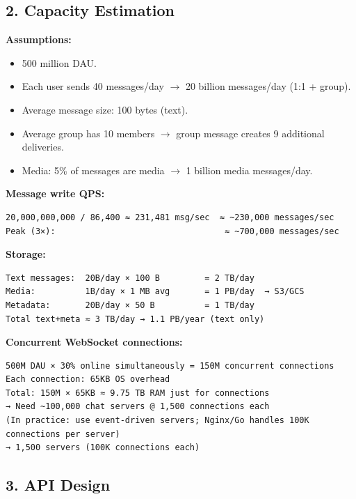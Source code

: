 \documentclass[11pt]{article}
\providecommand{\tightlist}{\setlength{\itemsep}{1pt}\setlength{\parskip}{0pt}}
\begin{document}
\subsection{2. Capacity Estimation}\label{2-capacity-estimation-3}

\textbf{Assumptions:}

\begin{itemize}
\tightlist
\item
  500 million DAU.
\item
  Each user sends 40 messages/day \(\rightarrow\) 20 billion messages/day (1:1 + group).
\item
  Average message size: 100 bytes (text).
\item
  Average group has 10 members \(\rightarrow\) group message creates 9 additional deliveries.
\item
  Media: 5\% of messages are media \(\rightarrow\) 1 billion media messages/day.
\end{itemize}

\textbf{Message write QPS:}

\setcodelang{}

\begin{verbatim}
20,000,000,000 / 86,400 ≈ 231,481 msg/sec  ≈ ~230,000 messages/sec
Peak (3×):                                  ≈ ~700,000 messages/sec
\end{verbatim}

\textbf{Storage:}

\setcodelang{}

\begin{verbatim}
Text messages:  20B/day × 100 B         = 2 TB/day
Media:          1B/day × 1 MB avg       = 1 PB/day  → S3/GCS
Metadata:       20B/day × 50 B          = 1 TB/day
Total text+meta ≈ 3 TB/day → 1.1 PB/year (text only)
\end{verbatim}

\textbf{Concurrent WebSocket connections:}

\setcodelang{}

\begin{verbatim}
500M DAU × 30% online simultaneously = 150M concurrent connections
Each connection: 65KB OS overhead
Total: 150M × 65KB ≈ 9.75 TB RAM just for connections
→ Need ~100,000 chat servers @ 1,500 connections each
(In practice: use event-driven servers; Nginx/Go handles 100K connections per server)
→ 1,500 servers (100K connections each)
\end{verbatim}

\subsection{3. API Design}\label{3-api-design-3}
\end{document}
